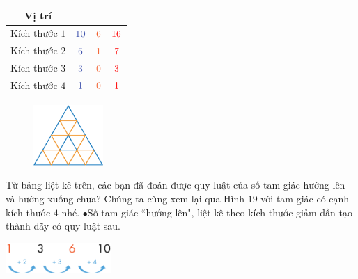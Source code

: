 \begin{multicols}{2}
	\begin{table}[H]
		\setlength{\tabcolsep}{2pt}
		\renewcommand{\arraystretch}{1.3}
		\begin{tabular}{|c|c|c|c|}
			\hline
			Vị trí & {\color{timhieukhoahoc}{Lên}}  & {\color{duongvaotoanhoc}{Xuống}} & {\color{red}{Tổng}}\\
			\hline
			Kích thước $1$  & ${\color{timhieukhoahoc}{10}}$ &${\color{duongvaotoanhoc}{6}}$ & ${\color{red}{16}}$ \\
			\hline
			Kích thước $2$  & ${\color{timhieukhoahoc}{6}}$ & ${\color{duongvaotoanhoc}{1}}$ &  ${\color{red}{7}}$ \\
			\hline
			Kích thước $3$  & ${\color{timhieukhoahoc}{3}}$ & ${\color{duongvaotoanhoc}{0}}$ & ${\color{red}{3}}$\\
			\hline
			Kích thước $4$  & ${\color{timhieukhoahoc}{1}}$ & ${\color{duongvaotoanhoc}{0}}$ & ${\color{red}{1}}$\\
			\hline
		\end{tabular}
	\end{table}
	\begin{figure}[H]
		\vspace*{5pt}
		\centering
		\captionsetup{labelformat= empty, justification=centering}
		\includegraphics[width=0.235\textwidth]{Hinh25_1}
		\caption{}
		\vspace*{-10pt}
	\end{figure}
\end{multicols}
Từ bảng liệt kê trên, các bạn đã đoán được quy luật của số tam giác hướng lên và hướng xuống chưa? Chúng ta cùng xem lại qua  Hình $19$ với tam giác có cạnh kích thước $4$ nhé.
\vskip 0.1cm
$\bullet$Số tam giác ``hướng lên", liệt kê theo kích thước giảm dần tạo thành dãy có quy luật sau.
\begin{center}
	\includegraphics[width=0.3\textwidth]{QuyLuat}
\end{center}	
